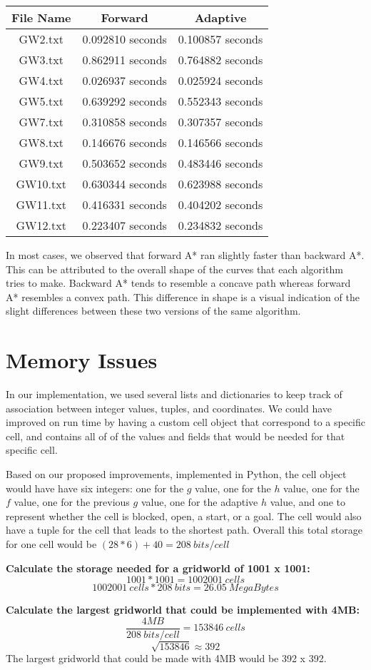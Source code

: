 \documentclass{article}
\begin{document}
\begin{center}
 \begin{tabular}{||c c c||} 
 \hline
 File Name & Forward & Adaptive \\ [0.5ex] 
 \hline\hline
 GW2.txt & 0.092810 seconds & 0.100857 seconds\\ 
 \hline
 GW3.txt & 0.862911 seconds & 0.764882 seconds\\
 \hline
 GW4.txt & 0.026937 seconds & 0.025924 seconds\\
 \hline
 GW5.txt & 0.639292 seconds & 0.552343 seconds\\
 \hline
 GW7.txt & 0.310858 seconds & 0.307357 seconds\\
 \hline
 GW8.txt & 0.146676 seconds & 0.146566 seconds\\
 \hline
 GW9.txt & 0.503652 seconds & 0.483446 seconds\\
 \hline
 GW10.txt & 0.630344 seconds & 0.623988 seconds\\
 \hline
 GW11.txt & 0.416331 seconds & 0.404202 seconds\\
 \hline
 GW12.txt & 0.223407 seconds & 0.234832 seconds\\
 \hline
\end{tabular}
\end{center}

In most cases, we observed that forward A* ran slightly faster than backward A*. This can be attributed to the overall shape of the curves that each algorithm tries to make. Backward A* tends to resemble a concave path whereas forward A* resembles a convex path. This difference in shape is a visual indication of the slight differences between these two versions of the same algorithm.

\section{Memory Issues}

In our implementation, we used several lists and dictionaries to keep track of association between integer values, tuples, and coordinates. We could have improved on run time by having a custom cell object that correspond to a specific cell, and contains all of of the values and fields that would be needed for that specific cell. \par
Based on our proposed improvements, implemented in Python, the cell object would have have six integers: one for the $g$ value, one for the $h$ value, one for the $f$ value, one for the previous $g$ value, one for the adaptive $h$ value, and one to represent whether the cell is blocked, open, a start, or a goal. The cell would also have a tuple for the cell that leads to the shortest path. Overall this total storage for one cell would be $(28 * 6) + 40 = 208 \: bits/cell $ \par
\textbf{Calculate the storage needed for a gridworld of 1001 x 1001:}
\[ 1001 * 1001 = 1002001 \: cells \]
\[ 1002001 \: cells * 208 \: bits = 26.05 \: MegaBytes\] 

\textbf{Calculate the largest gridworld that could be implemented with 4MB:}
\[ \frac{4MB}{208 \: bits/cell} = 153846\:cells\]
\[ \sqrt{153846} \approx 392\]
The largest gridworld that could be made with 4MB would be 392 x 392.
\end{document}
